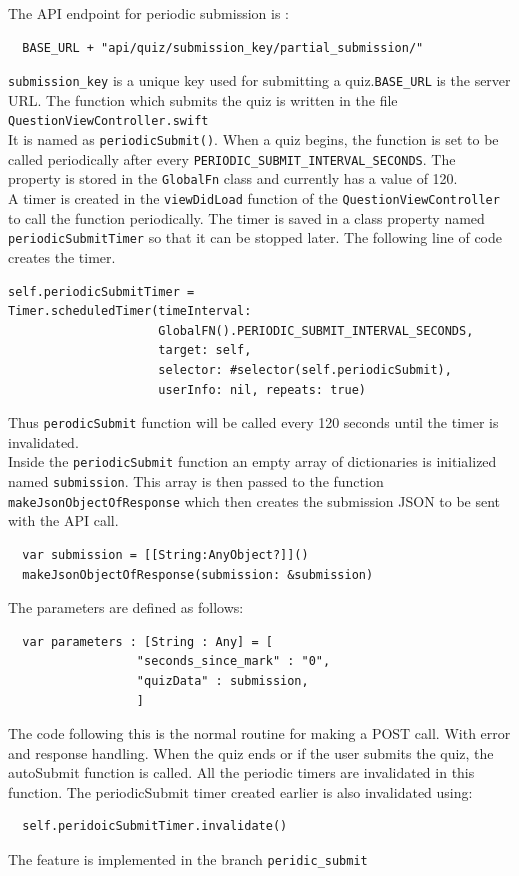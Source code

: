 \documentclass[12pt, conference, a4paper]{article}
\begin{document}
The API endpoint for periodic submission is : 
\begin{verbatim}
  BASE_URL + "api/quiz/submission_key/partial_submission/"
\end{verbatim}
\texttt{submission_key} is a unique key used for submitting a quiz.\texttt{BASE_URL} is the server URL. 
The function which submits the quiz is written in the file \texttt{QuestionViewController.swift} \\
It is named as \texttt{periodicSubmit()}. 
When a quiz begins, the function is set to be called periodically after every
\texttt{PERIODIC_SUBMIT_INTERVAL_SECONDS}. The property is stored in the \texttt{GlobalFn} class and currently has a value of 120. \\
A timer is created in the \texttt{viewDidLoad} function of the \texttt{QuestionViewController} to call the function periodically.
The timer is saved in a class property named \texttt{periodicSubmitTimer} so that it can be stopped later. The following line of code creates the timer. 
\begin{verbatim}
self.periodicSubmitTimer = 
Timer.scheduledTimer(timeInterval:
                     GlobalFN().PERIODIC_SUBMIT_INTERVAL_SECONDS, 
                     target: self,
                     selector: #selector(self.periodicSubmit), 
                     userInfo: nil, repeats: true)
\end{verbatim}
Thus \texttt{perodicSubmit} function will be called every 120 seconds until the timer is invalidated. \\
\newpage
Inside the \texttt{periodicSubmit} function an empty array of dictionaries is initialized named \texttt{submission}. This array is then passed to the function \texttt{makeJsonObjectOfResponse} which then creates the submission JSON to be sent with the API call. 
\begin{verbatim}
  var submission = [[String:AnyObject?]]()
  makeJsonObjectOfResponse(submission: &submission)
\end{verbatim}
The parameters are defined as follows: 
\begin{verbatim}
  var parameters : [String : Any] = [
                  "seconds_since_mark" : "0",
                  "quizData" : submission,
                  ]
\end{verbatim}
The code following this is the normal routine for making a POST call. With error and response handling. 
When the quiz ends or if the user submits the quiz, the autoSubmit function is called. All the periodic timers are invalidated in this function. The periodicSubmit timer created earlier is also invalidated using:
\begin{verbatim}
  self.peridoicSubmitTimer.invalidate()  
\end{verbatim}
The feature is implemented in the branch \texttt{peridic_submit}
\end{document}
